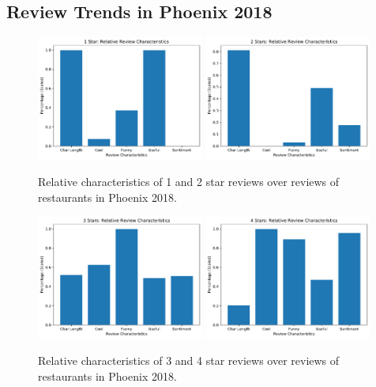 \subsection{Review Trends in Phoenix 2018}

\begin{figure}[h]
    \centering
    \includegraphics[width=0.49\textwidth]{img/phoenix2018/1Star.pdf}
    \includegraphics[width=0.49\textwidth]{img/phoenix2018/2Stars.pdf}
    \caption{Relative characteristics of 1 and 2 star reviews over reviews of restaurants in Phoenix 2018.}
    \label{fig:12star}
\end{figure}


\begin{figure}[h]
    \centering
    
    \includegraphics[width=0.49\textwidth]{img/phoenix2018/3Stars.pdf}
    \includegraphics[width=0.49\textwidth]{img/phoenix2018/4Stars.pdf}
    \caption{Relative characteristics of 3 and 4 star reviews over reviews of restaurants in Phoenix 2018.}
    \label{fig:34star}
\end{figure}

